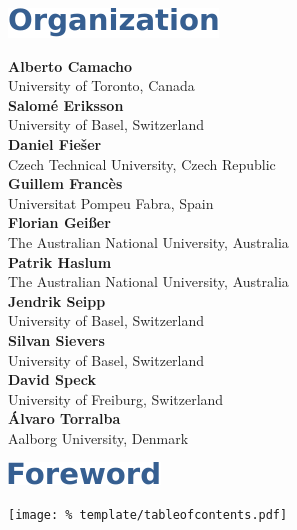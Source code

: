 \documentclass[letterpaper]{article}
\begin{document}

\cleardoublepage

\vspace*{5mm}
\includegraphics[trim={15pt 0pt 0pt 0pt}]{template/organization.pdf}

\vspace*{14mm}
\noindent
\textbf{Alberto Camacho}\\
University of Toronto, Canada\\[1em]
\textbf{Salom\'{e} Eriksson}\\
University of Basel, Switzerland\\[1em]
\textbf{Daniel Fie\v{s}er}\\
Czech Technical University, Czech Republic\\[1em]
\textbf{Guillem Franc\`es}\\
Universitat Pompeu Fabra, Spain\\[1em]
\textbf{Florian Gei{\ss}er}\\
The Australian National University, Australia\\[1em]
\textbf{Patrik Haslum}\\
The Australian National University, Australia\\[1em]
\textbf{Jendrik Seipp}\\
University of Basel, Switzerland\\[1em]
\textbf{Silvan Sievers}\\
University of Basel, Switzerland\\[1em]
\textbf{David Speck}\\
University of Freiburg, Switzerland\\[1em]
\textbf{\'{A}lvaro Torralba}\\
Aalborg University, Denmark

\clearpage

\vspace*{5mm}
\includegraphics[trim={15pt 0pt 0pt 0pt}]{template/preface.pdf}


\clearpage

\vspace*{5mm}
\texttt{[image: \%
 template/tableofcontents.pdf]}

\renewcommand\contentsname{}
\tableofcontents

\cleardoublepage
{}

\end{document}
